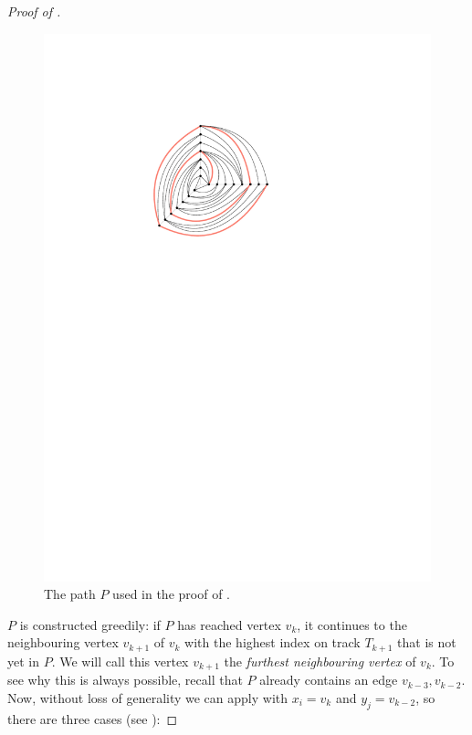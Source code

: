 \documentclass{patmorin}
\begin{document}
\begin{proof}[Proof of ]
  \begin{figure}
     \begin{center}
        \includegraphics{figs/graph-2}
     \end{center}
     \caption{The path $P$ used in the proof of .}
  \end{figure}

  $P$ is constructed greedily: if $P$ has reached vertex $v_k$, it continues to the neighbouring vertex
  $v_{k+1}$ of $v_{k}$ with the highest index on track $T_{k+1}$ that is not yet in $P$.
  We will call this vertex $v_{k+1}$ the \emph{furthest neighbouring vertex} of $v_k$.  To see why this is always possible,
  recall that $P$ already contains an edge $v_{k-3},v_{k-2}$. Now, without loss of generality we can
  apply  with $x_i=v_k$ and $y_j=v_{k-2}$, so there
  are three cases (see ):


\end{proof}
\end{document}

